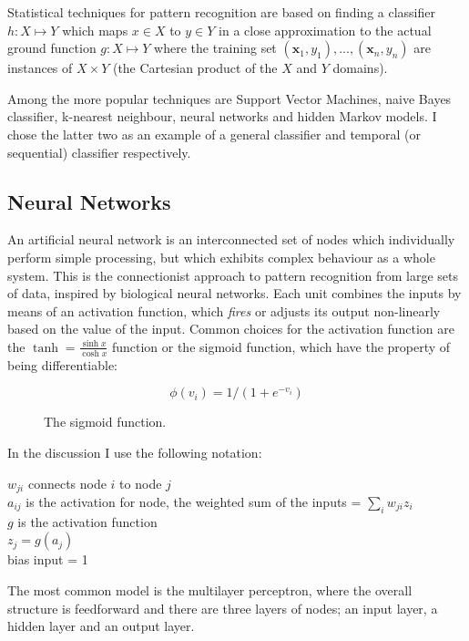 \documentclass[12pt,a4,notitlepage]{report}
\renewcommand{\_}{\texttt{\symbol{95}}}
\newcommand{\<}{\texttt{\symbol{60}}}
\renewcommand{\>}{\texttt{\symbol{62}}}
\begin{document}
Statistical techniques for pattern recognition are based on finding a classifier
$ h: X \mapsto Y $ which maps $x \in X$ to $y \in Y$ in a close approximation to the actual ground function $ g: X \mapsto Y $ where the training set $ (\mathbf x_1,y_1), ... , (\mathbf x_n, y_n) $ are instances of $X \times Y$ (the Cartesian product of the $X$ and $Y$ domains).

Among the more popular techniques are Support Vector Machines, naive Bayes classifier, k-nearest neighbour, neural networks and hidden Markov models. I chose the latter two as an example of a general classifier and temporal (or sequential) classifier respectively.

\subsection{Neural Networks}

An artificial neural network is an interconnected set of nodes which individually perform simple processing, but which exhibits complex behaviour as a whole system. This is the connectionist approach to pattern recognition from large sets of data, inspired by  biological neural networks. Each unit combines the inputs by means of an activation function, which {\em fires} or adjusts its output non-linearly based on the value of the input. Common choices for the activation function are the $\tanh = \frac{\sinh x}{\cosh x}$ function or the sigmoid function, which have the property of being differentiable:

\begin{figure}
\centering
\[ \phi(v_i) = 1/(1+e^{-v_i}) \]
\caption{The sigmoid function.}
\label{sigmoid}
\end{figure}

In the discussion I use the following notation:

$w_{ji}$ connects node $i$ to node $j$ \\
$a_{ij}$ is the activation for node, the weighted sum of the inputs = $\sum_i {w_{ji}z_i}$ \\
$g$ is the activation function \\
$z_j = g(a_j)$ \\
bias input = 1

The most common model is the multilayer perceptron\cite{NeuralPat}, where the overall structure is feedforward and there are three layers of nodes; an input layer, a hidden layer and an output layer.
\end{document}

